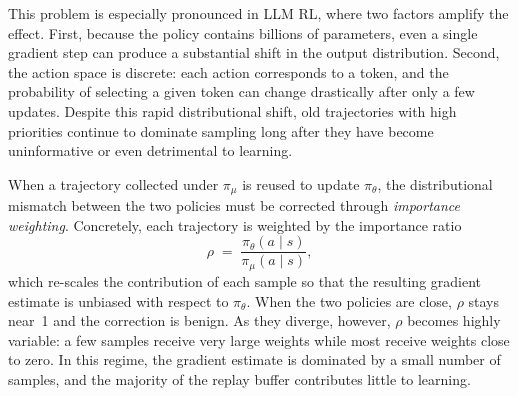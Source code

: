 \documentclass[runningheads]{llncs}
\begin{document}
This problem is especially pronounced in LLM RL, where two factors amplify the effect.
First, because the policy contains billions of parameters, even a single gradient step can produce a substantial shift in the output distribution.
Second, the action space is discrete: each action corresponds to a token, and the probability of selecting a given token can change drastically after only a few updates.
Despite this rapid distributional shift, old trajectories with high priorities continue to dominate sampling long after they have become uninformative or even detrimental to learning.

When a trajectory collected under $\pi_\mu$ is reused to update $\pi_\theta$, the distributional mismatch between the two policies must be corrected through \emph{importance weighting}.
Concretely, each trajectory is weighted by the importance ratio
\begin{equation}
    \rho \;=\; \frac{\pi_\theta(a \mid s)}{\pi_\mu(a \mid s)},
    \label{eq:importance_ratio}
\end{equation}
which re-scales the contribution of each sample so that the resulting gradient estimate is unbiased with respect to $\pi_\theta$.
When the two policies are close, $\rho$ stays near~1 and the correction is benign.
As they diverge, however, $\rho$ becomes highly variable: a few samples receive very large weights while most receive weights close to zero.
In this regime, the gradient estimate is dominated by a small number of samples, and the majority of the replay buffer contributes little to learning.
\end{document}
